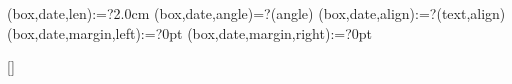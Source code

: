 \spine(box,date,len):=?{2.0cm}
\spine(box,date,angle)=?{\thespine(angle)}
\spine(box,date,align):=?{\thespine(text,align)}
\spine(box,date,margin,left):=?{0pt}
\spine(box,date,margin,right):=?{0pt}



\newif\ifisdim
\newcommand{\@setifisdim}[1]{%
  \StrLeft{#1}{1}[\@dimleft]%
  \StrRight{#1}{1}[\@dimright]%
  \IfInteger{\@dimleft}{%
    \IfInteger{\@dimright}{%
      \isdimfalse%
    }{%
      \isdimtrue%
    }%
  }{%
    \isdimfalse%
  }%
}
\newcommand{\IfIsDim}[3]{%
  \@setifisdim{#1}%
  \ifisdim#2\else#3\fi%
}


\newlength{\@spinelen}  %
\newlength{\@spineboxlen} %
\newlength{\@spinefixedlen} %
\newlength{\@spinevarlen} %
\newlength{\@spineboxseplen} %
\newlength{\@spinelr} %
\newlength{\@spinevarratio} %
[\@spineNBoxes]%
%


\newcommand{\@getspinelen}{%
  \setlength{\@spinelr}{\dimexpr\thespine(margin,left)+\thespine(margin,right)\relax}%
  \setlength{\@spineboxseplen}{\dimexpr \thespine(boxsep)*3\relax}%
  \setlength{\@spinefixedlen}{\dimexpr \@spinelr+\@spineboxseplen\relax}
  \setlength{\@spineboxlen}{0pt}
  \setlength{\@spinevarlen}{0pt}
  \@for\myi:=\expanded{\thespine(order)}\do{%
    \@tempdima=\dimexpr \thespine(box,\myi,len)\relax%
    \spine(box,\myi,len):={\the\@tempdima}
    \typeout{SPINEBOXLEN[\myi]=\the\@tempdima}
    \addtolength{\@spineboxlen}{\@tempdima}
    \ifdatadefined{spine}(box,\myi,len){%
      \addtolength{\@spinefixedlen}{\@tempdima}
    }{%
      \addtolength{\@spinevarlen}{\@tempdima}
    }%
  }%
  \setlength{\@spinelen}{\dimexpr \@spinefixedlen+\@spinevarlen\relax}
  \typeout{SPINELEN[lr]=\the\@spinelr}%
  \typeout{SPINELEN[boxseplen]=\the\@spineboxseplen}%
  \typeout{SPINELEN[boxlen]=\the\@spineboxlen}%
  \typeout{SPINELEN[boxfixedlen]=\the\@spinefixedlen}%
  \typeout{SPINELEN[boxvarlen]=\the\@spinevarlen}%
  \typeout{SPINELEN[spinelen]=\the\@spinelen}%
  \typeout{SPINELEN[spinelen]=\the\@spinelen}%
}

